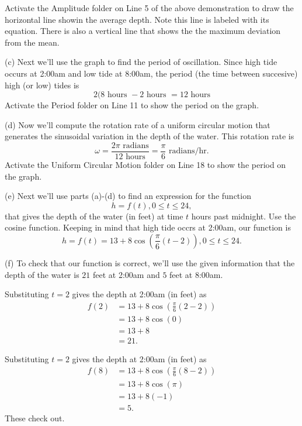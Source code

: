 \documentclass{ximera}
\begin{document}
\begin{example}
\begin{explanation}
Activate the Amplitude folder on Line 5 of the above demonstration to draw the horizontal line showin the average depth. Note this line is labeled with its equation. There is also a vertical line that shows the the maximum deviation from the mean.

(c) Next we'll use the graph to find the period of oscillation. Since high tide occurs at 2:00am and low tide at 8:00am, the period (the time between succesive) high (or low) tides is
\[
    2(8 \text{ hours } - 2 \text{ hours } = 12 \text{ hours}
\]
Activate the Period folder on Line 11 to show the period on the graph.

(d) Now we'll compute the rotation rate of a uniform circular motion that generates the sinusoidal variation in the depth of the water. This rotation rate is
\[
  \omega = \frac{2\pi \text{ radians}}{12 \text{ hours}} = \frac{\pi}{6} \text{ radians/hr} .
\]
Activate the Uniform Circular Motion folder on Line 18 to show the period on the graph.

(e) Next we'll use parts (a)-(d) to find an expression for the function 
\[
   h = f(t) ,  0\leq t \leq 24, 
\]
that gives the depth of the water (in feet) at time $t$ hours past midnight. Use the cosine function. Keeping in mind that high tide occrs at 2:00am, our function is 
\[
   h  = f(t) = 13 + 8 \cos \left(  \frac{\pi}{6} \left( t - 2 \right) \right),  0\leq t \leq 24.
\]



(f) To check that our function is correct, we'll use the given information that the depth of the water is $21$ feet at 2:00am and $5$ feet at 8:00am.

Substituting $t=2$ gives the depth at 2:00am (in feet) as
\begin{align*}
   f(2)   & = 13 + 8 \cos \left(  \frac{\pi}{6} \left( 2 - 2 \right) \right) \\ 
           & = 13 + 8 \cos (0)  \\ 
           & = 13 + 8 \\
           & = 21 .
\end{align*}

Substituting $t=2$ gives the depth at 2:00am (in feet) as
\begin{align*}
   f(8)   & = 13 + 8 \cos \left(  \frac{\pi}{6} \left(8 - 2 \right) \right) \\ 
           & = 13 + 8 \cos (\pi)  \\ 
           & = 13 + 8(-1) \\
           & = 5 .
\end{align*}
These check out.


\end{explanation}
\end{example}
\end{document}
